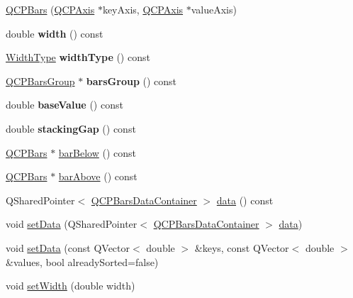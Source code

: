 \begin{DoxyCompactItemize}
\item 
\hyperlink{classQCPBars_a64006999ad9dff308f40df41cef176ad}{Q\+C\+P\+Bars} (\hyperlink{classQCPAxis}{Q\+C\+P\+Axis} $\ast$key\+Axis, \hyperlink{classQCPAxis}{Q\+C\+P\+Axis} $\ast$value\+Axis)
\item 
\mbox{\label{classQCPBars_abe7eb3987d8711f45829db879aee2280}} 
double {\bfseries width} () const
\item 
\mbox{\label{classQCPBars_a4c103fb405a45f47853e0345f0c6e708}} 
\hyperlink{classQCPBars_a65dbbf1ab41cbe993d71521096ed4649}{Width\+Type} {\bfseries width\+Type} () const
\item 
\mbox{\label{classQCPBars_a5eef59840b68d205df4e0c3df5f97633}} 
\hyperlink{classQCPBarsGroup}{Q\+C\+P\+Bars\+Group} $\ast$ {\bfseries bars\+Group} () const
\item 
\mbox{\label{classQCPBars_a29a7b3b86f80b2a04bd1f9ec0ebaf422}} 
double {\bfseries base\+Value} () const
\item 
\mbox{\label{classQCPBars_a2e6192fa9c16df7ba94cd50c0c9ec7ce}} 
double {\bfseries stacking\+Gap} () const
\item 
\hyperlink{classQCPBars}{Q\+C\+P\+Bars} $\ast$ \hyperlink{classQCPBars_a1b58664864b141f45e02044a855b3213}{bar\+Below} () const
\item 
\hyperlink{classQCPBars}{Q\+C\+P\+Bars} $\ast$ \hyperlink{classQCPBars_ab97f2acd9f6cb40d2cc3c33d278f0e78}{bar\+Above} () const
\item 
Q\+Shared\+Pointer$<$ \hyperlink{classQCPDataContainer}{Q\+C\+P\+Bars\+Data\+Container} $>$ \hyperlink{classQCPBars_a7e373a534d82e18ed27b3fafd1f08fae}{data} () const
\item 
void \hyperlink{classQCPBars_a6dc562ec7120a8521e1061f2134367e4}{set\+Data} (Q\+Shared\+Pointer$<$ \hyperlink{classQCPDataContainer}{Q\+C\+P\+Bars\+Data\+Container} $>$ \hyperlink{classQCPBars_a7e373a534d82e18ed27b3fafd1f08fae}{data})
\item 
void \hyperlink{classQCPBars_a2a88cd5b16ec7b71e5a590f95b50c5ce}{set\+Data} (const Q\+Vector$<$ double $>$ \&keys, const Q\+Vector$<$ double $>$ \&values, bool already\+Sorted=false)
\item 
void \hyperlink{classQCPBars_afec6116579d44d5b706e0fa5e5332507}{set\+Width} (double width)

\end{DoxyCompactItemize}
